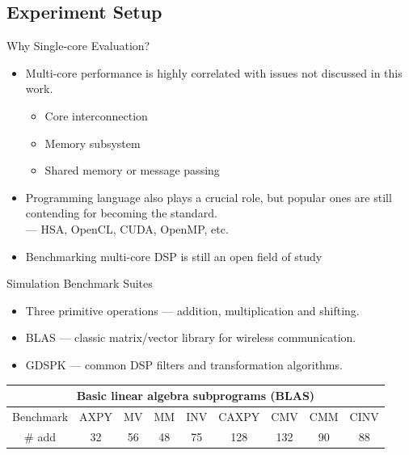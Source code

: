 \documentclass{beamer}
\begin{document}
\begin{CJK}{UTF8}{bkai}
    \subsection{Experiment Setup}
    \begin{frame}{Why Single-core Evaluation?}
        \begin{itemize}
            \item Multi-core performance is highly correlated with issues not discussed in this work.
                \begin{itemize}
                    \item Core interconnection
                    \item Memory subsystem 
                    \item Shared memory or message passing
                \end{itemize}
            \item Programming language also plays a crucial role, but popular ones are still contending for becoming the standard. \\
                --- HSA, OpenCL, CUDA, OpenMP, etc.
            \item Benchmarking multi-core DSP is still an open field of study~\cite{landscape}
        \end{itemize}       
    \end{frame}
    \begin{frame}{Simulation Benchmark Suites}
        \begin{itemize}
            \item Three primitive operations --- addition, multiplication and shifting.
            \item BLAS --- classic matrix/vector library for wireless communication.
            \item GDSPK --- common DSP filters and transformation algorithms.
        \end{itemize}
        \begin{table}[!ht]
            \centering
            \resizebox{\columnwidth}{!}
            {
                \begin{tabular}{|c|c|c|c|c|c|c|c|c|}
                    \hline
                    \multicolumn{9}{|c|}{\textbf{Basic linear algebra subprograms (BLAS)}} \\ \hline
                    Benchmark              & AXPY   & MV     & MM      & INV      & CAXPY  & CMV  & CMM    & CINV  \\ \hline
                    \# add            &  32    &  56    &   48    &    75    &  128   & 132  &   90   &  88   \\ \hline

\end{tabular}}
\end{table}
\end{frame}
\end{CJK}
\end{document}
